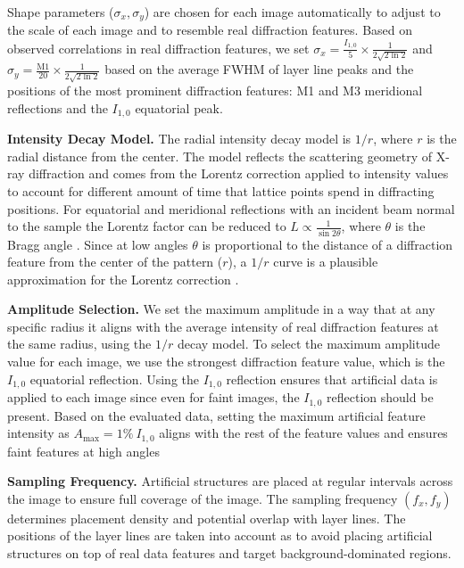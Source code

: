 \documentclass[iucr,review]{iucrjournals}
\begin{document}
Shape parameters ($\sigma_x, \sigma_y$)
are chosen for each image automatically to adjust to the scale of each image and to
resemble real diffraction features.
Based on observed correlations in real diffraction features, we set $\sigma_x = \frac{I_{1,0}}{5}\times \frac{1}{2\sqrt{2 \ln 2}}$ and
$\sigma_y = \frac{\mathrm{M}1}{20}\times \frac{1}{2\sqrt{2 \ln 2}}$ based on
the average FWHM of layer line peaks and the positions of the most prominent diffraction features:
M1 and M3 meridional reflections and the $I_{1,0}$ equatorial peak.



\textbf{Intensity Decay Model.}
The radial intensity decay model is $1/r$, where $r$ is the radial distance from the center.
The model reflects the scattering geometry of X-ray diffraction and comes from the Lorentz correction applied to 
intensity values to account for different amount of time that lattice points spend in diffracting positions.
For equatorial and meridional reflections with an incident beam normal to the sample the Lorentz factor can be reduced to $L \propto \frac{1}{\sin 2 \theta}$, 
where $\theta$ is the Bragg angle \cite{Buerger1940}.
Since at low angles $\theta$ is proportional to the distance of a diffraction feature from the center of the pattern ($r$),
a $1/r$ curve is a plausible approximation for the Lorentz correction \cite{Denny1995}.


\textbf{Amplitude Selection.}
We set the maximum amplitude in a way that at any specific radius it aligns with
the average intensity of real diffraction features at the same radius, using the $1/r$ decay model.
To select the maximum amplitude value for each image, we use the strongest diffraction feature value, which is the $I_{1,0}$ equatorial reflection.
Using  the $I_{1,0}$ reflection ensures that artificial data is applied to each image since even for faint images, the $I_{1,0}$ reflection should be present. 
Based on the evaluated data, setting the maximum artificial feature intensity as $A_{\mathrm{max}} = 1\%\ I_{1,0}$
aligns with the rest of the feature values and ensures faint features at high angles

\textbf{Sampling Frequency.}
Artificial structures are placed at regular intervals across the image to ensure full coverage of the image.
The sampling frequency $(f_x, f_y)$ determines placement density and potential overlap with layer lines.
The positions of the layer lines are taken 
into account as to avoid placing artificial structures on top of real data features and target background-dominated regions. 
\end{document}
